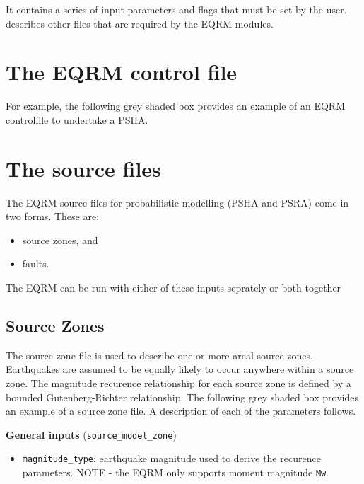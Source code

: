 It contains a series of input parameters and flags that must be set
by the user.  describes other files
that are required by the EQRM modules.

\section{The EQRM control file}
\label{sec:application-EQRMcf}




\clearpage For example, the following grey shaded box provides an
example of an EQRM controlfile to undertake a PSHA.




\clearpage
\section{The source files}

The EQRM source files for probabilistic modelling (PSHA and PSRA)
come in two forms. These are:
\begin{itemize}
\item source zones, and
\item faults.
\end{itemize}
The EQRM can be run with either of these inputs seprately or both
together


\subsection{Source Zones}
\label{sec:source-zone-file}

The source zone file is used to describe one or more areal source
zones. Earthquakes are assumed to be equally likely to occur
anywhere within a source zone. The magnitude recurence relationship
for each source zone is defined by a bounded Gutenberg-Richter
relationship. The following grey shaded box provides an example of a
source zone file. A description of each of the parameters follows.


\textbf{General inputs} (\texttt{source\_model\_zone})
\begin{itemize}
\item \texttt{magnitude\_type}: earthquake magnitude used to derive the
recurence parameters. NOTE - the EQRM only supports moment magnitude
\texttt{Mw}.
\end{itemize}

